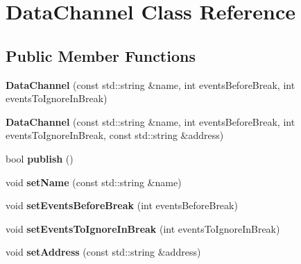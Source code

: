 \hypertarget{classDataChannel}{\section{Data\-Channel Class Reference}
\label{classDataChannel}
}
\subsection*{Public Member Functions}
\begin{DoxyCompactItemize}
\item 
\hypertarget{classDataChannel_afddd4706fd837ed68f509425bc3a6b66}{{\bfseries Data\-Channel} (const std\-::string \&name, int events\-Before\-Break, int events\-To\-Ignore\-In\-Break)}\label{classDataChannel_afddd4706fd837ed68f509425bc3a6b66}

\item 
\hypertarget{classDataChannel_aede3c0b8afa801ffd300d65fb91e9fdd}{{\bfseries Data\-Channel} (const std\-::string \&name, int events\-Before\-Break, int events\-To\-Ignore\-In\-Break, const std\-::string \&address)}\label{classDataChannel_aede3c0b8afa801ffd300d65fb91e9fdd}

\item 
\hypertarget{classDataChannel_ab9e138d3332e8c540bb1769c4dab8517}{bool {\bfseries publish} ()}\label{classDataChannel_ab9e138d3332e8c540bb1769c4dab8517}

\item 
\hypertarget{classDataChannel_ab5f6bc6ce5d7f83a26598069df067c5f}{void {\bfseries set\-Name} (const std\-::string \&name)}\label{classDataChannel_ab5f6bc6ce5d7f83a26598069df067c5f}

\item 
\hypertarget{classDataChannel_a640900fcffff28e003bc0a34e6d4d68a}{void {\bfseries set\-Events\-Before\-Break} (int events\-Before\-Break)}\label{classDataChannel_a640900fcffff28e003bc0a34e6d4d68a}

\item 
\hypertarget{classDataChannel_ab7faf42f153cdae64b36ed8f0f723dca}{void {\bfseries set\-Events\-To\-Ignore\-In\-Break} (int events\-To\-Ignore\-In\-Break)}\label{classDataChannel_ab7faf42f153cdae64b36ed8f0f723dca}

\item 
\hypertarget{classDataChannel_a293e391e94c5920151a531078ecf9891}{void {\bfseries set\-Address} (const std\-::string \&address)}\label{classDataChannel_a293e391e94c5920151a531078ecf9891}


\end{DoxyCompactItemize}
